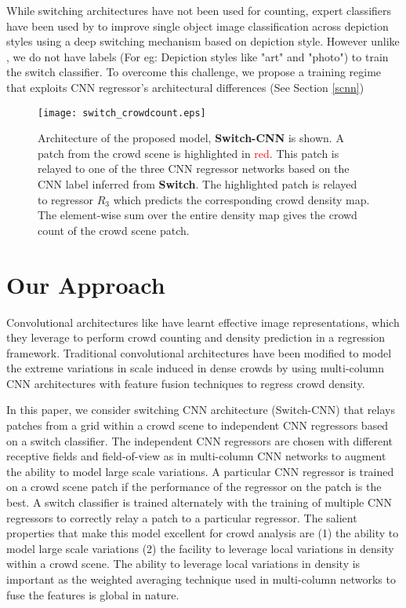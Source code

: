\documentclass[10pt,twocolumn,letterpaper]{article}
\begin{document}
While switching architectures have not been used for counting, expert classifiers have been used by \cite{sarvadevabhatla2016swiden} to improve single object image classification across depiction styles using a deep switching mechanism based on depiction style. However unlike \cite{sarvadevabhatla2016swiden}, we do not have labels (For eg: Depiction styles like "art" and "photo") to train the switch classifier. To overcome this challenge, we propose a training regime that exploits CNN regressor's architectural differences (See Section \ref{scnn}) 



\begin{figure}[!t]
 \texttt{[image: switch\_crowdcount.eps]}\hspace{0.3cm}%
 \caption{Architecture of the proposed model, \textbf{Switch-CNN} is shown. A patch from the crowd scene is highlighted in \textcolor{red}{red}. This patch is relayed to one of the three CNN regressor networks based on the CNN label inferred from \textbf{Switch}. The highlighted patch is relayed to regressor $R_3$ which predicts the corresponding crowd density map. The element-wise sum over the entire density map gives the crowd count of the crowd scene patch.}
\label{arch}
\end{figure}


\section{Our Approach}
Convolutional architectures like \cite{zhang2015cross,zhang2016single,onoro2016towards} have learnt effective image representations, which they leverage to perform crowd counting and density prediction in a regression framework. Traditional convolutional architectures have been modified to model the extreme variations in scale induced in dense crowds by using multi-column CNN architectures with feature fusion techniques to regress crowd density. 


In this paper, we consider switching CNN architecture (Switch-CNN) that relays patches from a grid within a crowd
scene to independent CNN regressors based on a switch classifier.
The independent CNN regressors are chosen with different receptive
fields and field-of-view as in multi-column CNN networks to augment
the ability to model large scale variations. A particular CNN regressor
is trained on a crowd scene patch if the performance of the regressor
on the patch is the best. A switch classifier is trained
alternately with the training of multiple CNN regressors to correctly
relay a patch to a particular regressor. The salient properties that
make this model excellent for crowd analysis are (1) the ability
to model large scale variations (2) the facility to leverage local
variations in density within a crowd scene. The ability to leverage
local variations in density is important as the weighted averaging
technique used in multi-column networks to fuse the features is global
in nature.
\end{document}
